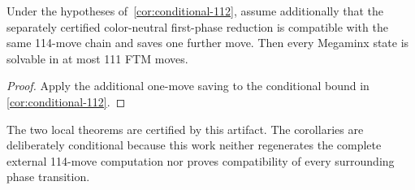 \begin{corollary}
\label{cor:conditional-111}
Under the hypotheses of~\cref{cor:conditional-112}, assume additionally that
the separately certified color-neutral first-phase reduction is compatible
with the same 114-move chain and saves one further move.  Then every Megaminx
state is solvable in at most 111 FTM moves.
\end{corollary}

\begin{proof}
Apply the additional one-move saving to the conditional bound in
\cref{cor:conditional-112}.
\end{proof}

The two local theorems are certified by this artifact.  The corollaries are
deliberately conditional because this work neither regenerates the complete
external 114-move computation nor proves compatibility of every surrounding
phase transition.
